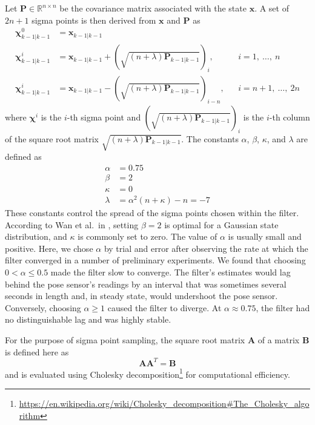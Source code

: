 Let $\mathbf{P} \in \mathbb{R}^{n \times n}$ be the covariance matrix associated with the state $\mathbf{x}$. A set of $2n + 1$ sigma points is then derived from $\mathbf{x}$ and $\mathbf{P}$ as
%
\begin{align}
\bm{\chi}^{0}_{k-1 | k-1} &= \mathbf{x}_{k-1 | k-1} \nonumber\\
\bm{\chi}^{i}_{k-1 | k-1} &= \mathbf{x}_{k-1 | k-1} + \left( \sqrt{\left( n + \lambda \right) \mathbf{P}_{k-1 | k-1}} \right)_{i}, &&i = 1,\ \dots,\ n \\
\bm{\chi}^{i}_{k-1 | k-1} &= \mathbf{x}_{k-1 | k-1} - \left( \sqrt{\left( n + \lambda \right) \mathbf{P}_{k-1 | k-1}} \right)_{i-n}, &&i = n+1,\ \dots,\ 2n \nonumber
\end{align}
%
where $\bm{\chi}^{i}$ is the $i$-th sigma point and $\left( \sqrt{\left( n + \lambda \right) \mathbf{P}_{k-1 | k-1}} \right)_{i}$ is the $i$-th column of the square root matrix $\sqrt{\left( n + \lambda \right) \mathbf{P}_{k-1 | k-1}}$. The constants $\alpha$, $\beta$, $\kappa$, and $\lambda$ are defined as
%
\begin{align}
\alpha &= 0.75 \\
\beta &= 2 \\
\kappa &= 0 \\
\lambda &= \alpha^{2} \left( n + \kappa \right) - n = -7
\end{align}
%
These constants control the spread of the sigma points chosen within the filter. According to Wan et al.\ in \cite{Wan2000}, setting $\beta = 2$ is optimal for a Gaussian state distribution, and $\kappa$ is commonly set to zero. The value of $\alpha$ is usually small and positive. Here, we chose $\alpha$ by trial and error after observing the rate at which the filter converged in a number of preliminary experiments. We found that choosing $0 < \alpha \leq 0.5$ made the filter slow to converge. The filter's estimates would lag behind the pose sensor's readings by an interval that was sometimes several seconds in length and, in steady state, would undershoot the pose sensor. Conversely, choosing $\alpha \geq 1$ caused the filter to diverge. At $\alpha \approx 0.75$, the filter had no distinguishable lag and was highly stable.

For the purpose of sigma point sampling, the square root matrix $\mathbf{A}$ of a matrix $\mathbf{B}$ is defined here as
%
\begin{equation}
\mathbf{A} \mathbf{A}^{T} = \mathbf{B}
\end{equation}
%
and is evaluated using Cholesky decomposition\footnote{\url{https://en.wikipedia.org/wiki/Cholesky_decomposition\#The_Cholesky_algorithm}} for computational efficiency.

